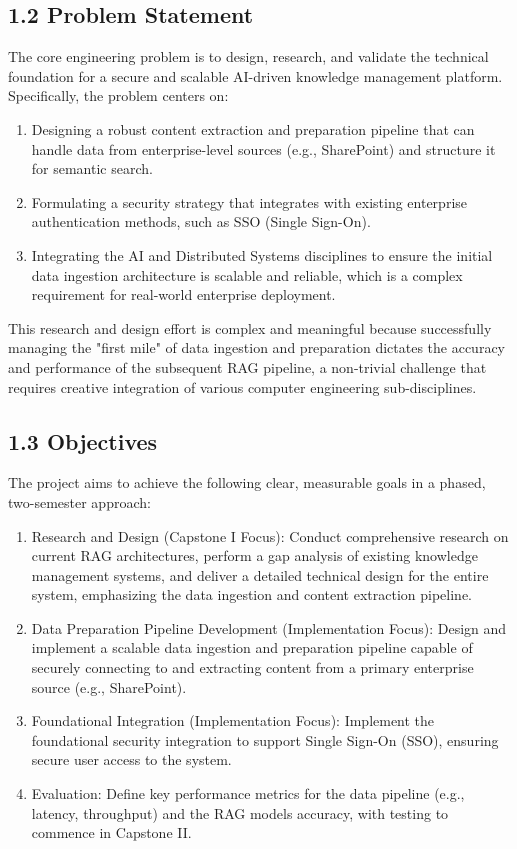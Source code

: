 \documentclass[12pt]{article}
\begin{document}
\subsection{1.2 Problem Statement}\label{problem-statement}

The core engineering problem is to design, research, and validate the
technical foundation for a secure and scalable AI-driven knowledge
management platform. Specifically, the problem centers on:

\begin{enumerate}
\def\labelenumi{\arabic{enumi}.}
\item
  Designing a robust content extraction and preparation pipeline that
  can handle data from enterprise-level sources (e.g., SharePoint) and
  structure it for semantic search.
\item
  Formulating a security strategy that integrates with existing
  enterprise authentication methods, such as SSO (Single Sign-On).
\item
  Integrating the AI and Distributed Systems disciplines to ensure the
  initial data ingestion architecture is scalable and reliable, which is
  a complex requirement for real-world enterprise deployment.
\end{enumerate}

This research and design effort is complex and meaningful because
successfully managing the "first mile" of data ingestion and preparation
dictates the accuracy and performance of the subsequent RAG pipeline, a
non-trivial challenge that requires creative integration of various
computer engineering sub-disciplines.

\subsection{1.3 Objectives}\label{objectives}

The project aims to achieve the following clear, measurable goals in a
phased, two-semester approach:

\begin{enumerate}
\def\labelenumi{\arabic{enumi}.}
\item
  Research and Design (Capstone I Focus): Conduct comprehensive research
  on current RAG architectures, perform a gap analysis of existing
  knowledge management systems, and deliver a detailed technical design
  for the entire system, emphasizing the data ingestion and content
  extraction pipeline.
\item
  Data Preparation Pipeline Development (Implementation Focus): Design
  and implement a scalable data ingestion and preparation pipeline
  capable of securely connecting to and extracting content from a
  primary enterprise source (e.g., SharePoint).
\item
  Foundational Integration (Implementation Focus): Implement the
  foundational security integration to support Single Sign-On (SSO),
  ensuring secure user access to the system.
\item
  Evaluation: Define key performance metrics for the data pipeline
  (e.g., latency, throughput) and the RAG model\textquotesingle s
  accuracy, with testing to commence in Capstone II.
\end{enumerate}
\end{document}
